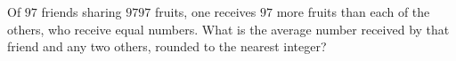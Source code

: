 Of $97$ friends sharing $9797$ fruits, one receives $97$ more fruits than each of the others, who receive equal numbers. What is the average number received by that friend and any two others, rounded to the nearest integer?
